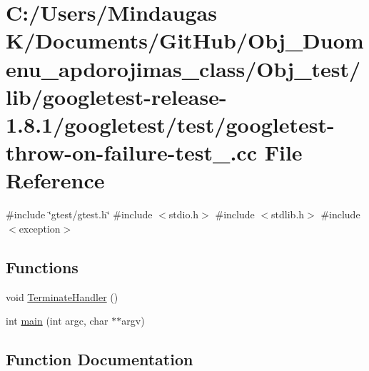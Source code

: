 \hypertarget{_obj__test_2lib_2googletest-release-1_88_81_2googletest_2test_2googletest-throw-on-failure-test___8cc}{}\section{C\+:/\+Users/\+Mindaugas K/\+Documents/\+Git\+Hub/\+Obj\+\_\+\+Duomenu\+\_\+apdorojimas\+\_\+class/\+Obj\+\_\+test/lib/googletest-\/release-\/1.8.1/googletest/test/googletest-\/throw-\/on-\/failure-\/test\+\_\+.cc File Reference}
\label{_obj__test_2lib_2googletest-release-1_88_81_2googletest_2test_2googletest-throw-on-failure-test___8cc}
{\ttfamily \#include \char`\"{}gtest/gtest.\+h\char`\"{}}\newline
{\ttfamily \#include $<$stdio.\+h$>$}\newline
{\ttfamily \#include $<$stdlib.\+h$>$}\newline
{\ttfamily \#include $<$exception$>$}\newline
\subsection*{Functions}
\begin{DoxyCompactItemize}
\item 
void \mbox{\hyperlink{_obj__test_2lib_2googletest-release-1_88_81_2googletest_2test_2googletest-throw-on-failure-test___8cc_a478ad0386ef3cac98d230812ed07eeda}{Terminate\+Handler}} ()
\item 
int \mbox{\hyperlink{_obj__test_2lib_2googletest-release-1_88_81_2googletest_2test_2googletest-throw-on-failure-test___8cc_a3c04138a5bfe5d72780bb7e82a18e627}{main}} (int argc, char $\ast$$\ast$argv)
\end{DoxyCompactItemize}


\subsection{Function Documentation}
\mbox{\label{_obj__test_2lib_2googletest-release-1_88_81_2googletest_2test_2googletest-throw-on-failure-test___8cc_a3c04138a5bfe5d72780bb7e82a18e627}} 
